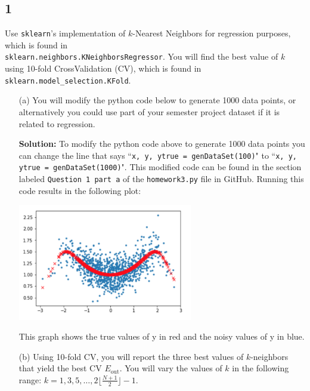 \documentclass[a4paper]{article}
\begin{document}
\subsection{1} Use \verb|sklearn|’s implementation of $k$-Nearest Neighbors for regression 
purposes, which is found in \\
\verb|sklearn.neighbors.KNeighborsRegressor|.  You will find the best value of $k$ using 10-fold 
CrossValidation (CV), which is found in \verb|sklearn.model_selection.KFold|.
\begin{itemize}
    \item[(a)] You will modify the python code below to generate 1000 data points, or alternatively 
    you could use part of your semester project dataset if it is related to regression.
    
    
    \textbf{Solution:} To modify the python code above to generate 1000 data points you can change 
    the line that says ``\verb|x, y, ytrue = genDataSet(100)|" to ``\verb|x, y, ytrue = genDataSet(1000)|".  
    This modified code can be found in the section labeled \verb|Question 1 part a| of the 
    \verb|homework3.py| file in GitHub.  Running this code results in the following plot:
    \begin{center}
        \includegraphics[width=0.6\textwidth]{1a.jpg}
    \end{center}
    This graph shows the true values of y in red and the noisy values of y in blue.
    
    \item[(b)] Using 10-fold CV, you will report the three best values of $k$-neighbors that yield 
    the best CV $E_{\text{out}}$.  You will vary the values of $k$ in the following range: $k = 1, 
    3, 5, \ldots, 2 \lfloor\frac{N+1}{2}\rfloor - 1$.
    

\end{itemize}
\end{document}
